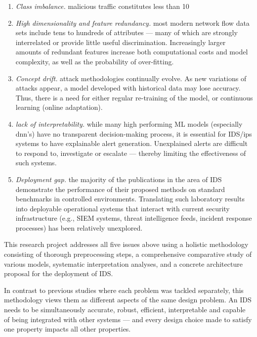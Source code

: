 \begin{enumerate}
\item {\it Class imbalance.} malicious traffic constitutes less than 10%
\item {\it High dimensionality and feature redundancy.} most modern network flow data sets include tens to hundreds of attributes --- many of which are strongly interrelated or provide little useful discrimination. Increasingly larger amounts of redundant features increase both computational costs and model complexity, as well as the probability of over-fitting.
\item {\it Concept drift.} attack methodologies continually evolve. As new variations of attacks appear, a model developed with historical data may lose accuracy. Thus, there is a need for either regular re-training of the model, or continuous learning (online adaptation).
\item {\it lack of interpretability.} while many high performing ML models (especially dnn's) have no transparent decision-making process, it is essential for IDS/ips systems to have explainable alert generation. Unexplained alerts are difficult to respond to, investigate or escalate --- thereby limiting the effectiveness of such systems.
\item {\it Deployment gap.} the majority of the publications in the area of IDS demonstrate the performance of their proposed methods on standard benchmarks in controlled environments. Translating such laboratory results into deployable operational systems that interact with current security infrastructure (e.g., SIEM systems, threat intelligence feeds, incident response processes) has been relatively unexplored.
\end{enumerate}

This research project addresses all five issues above using a holistic methodology consisting of thorough preprocessing steps, a comprehensive comparative study of various models, systematic interpretation analyses, and a concrete architecture proposal for the deployment of IDS.

In contrast to previous studies where each problem was tackled separately, this methodology views them as different aspects of the same design problem. An IDS needs to be simultaneously accurate, robust, efficient, interpretable and capable of being integrated with other systems --- and every design choice made to satisfy one property impacts all other properties.

